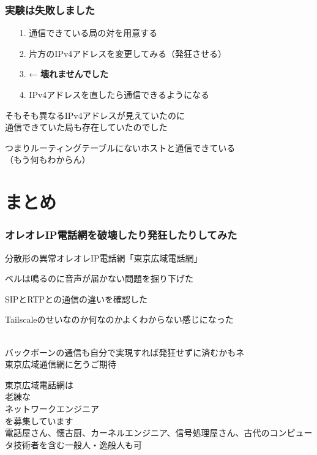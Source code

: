 \documentclass[
  lualatex,
  aspectratio=169,
  14pt
]{beamer}
\begin{document}
\begin{frame}
  \frametitle{実験は失敗しました}

  \begin{itemize}
    \item[1.]
      通信できている局の対を用意する
    \item[2.]
      片方のIPv4アドレスを変更してみる（発狂させる）
    \item[3.]
       ← \textbf{壊れませんでした}
    \item[4.]
      IPv4アドレスを直したら通信できるようになる
  \end{itemize}

  そもそも異なるIPv4アドレスが見えていたのに\\
  \hspace{1.5\zw}通信できていた局も存在していたのでした

  つまりルーティングテーブルにないホストと通信できている\\
  \hspace{1.5\zw}（もう何もわからん）

  \note{ }
\end{frame}

\section{まとめ}
\note{ }

\begin{frame}
  \frametitle{オレオレIP電話網を破壊したり発狂したりしてみた}

  分散形の異常オレオレIP電話網「東京広域電話網」

  ベルは鳴るのに音声が届かない問題を掘り下げた

  SIPとRTPとの通信の違いを確認した

  Tailscaleのせいなのか何なのかよくわからない感じになった

  ~\\[-.5\baselineskip]

  バックボーンの通信も自分で実現すれば発狂せずに済むかもネ\\
  \hspace{1.5\zw}東京広域通信網に乞うご期待
\end{frame}

\begin{frame}[standout]
  東京広域電話網は\\
  {\Huge 老練な\\ネットワークエンジニア}\\
  を募集しています\\[1\baselineskip]
  {\tiny 電話屋さん、懐古厨、カーネルエンジニア、信号処理屋さん、古代のコンピュータ技術者を含む一般人・逸般人も可}
  \\[-2\baselineskip]

  \note{ }
\end{frame}
\end{document}
